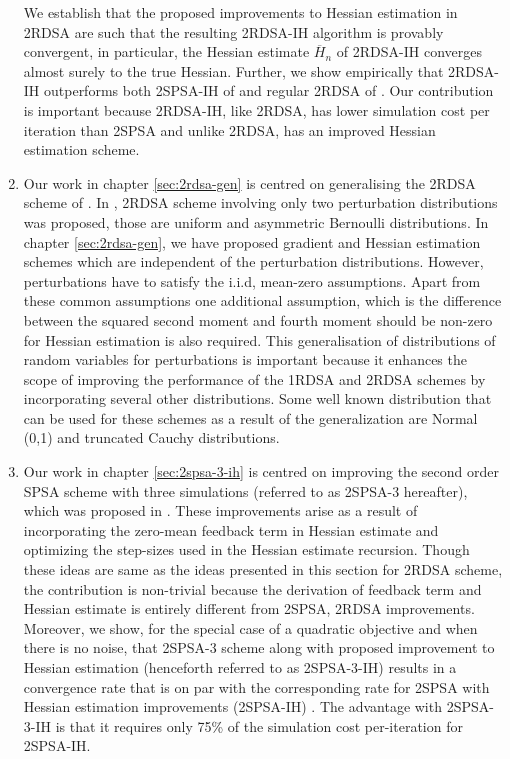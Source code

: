 \begin{enumerate}
We establish that the proposed improvements to Hessian estimation in 2RDSA are such  that the resulting 2RDSA-IH algorithm is provably convergent, in particular, the Hessian estimate $\overline H_n$ of 2RDSA-IH converges almost surely to the true Hessian. 
Further, we show empirically that 2RDSA-IH outperforms both 2SPSA-IH of \cite{spall-jacobian} and regular 2RDSA of \cite{prashanth2015rdsa}. Our contribution is important because 2RDSA-IH, like 2RDSA, has lower simulation cost per iteration than 2SPSA and unlike 2RDSA, has an improved Hessian estimation scheme.
\item Our work in chapter  \ref{sec:2rdsa-gen} is centred on generalising the 2RDSA scheme of \cite{prashanth2015rdsa}. In \cite{prashanth2015rdsa}, 2RDSA scheme involving only two perturbation distributions was proposed, those are uniform and asymmetric Bernoulli distributions. In chapter \ref{sec:2rdsa-gen}, we have proposed gradient and Hessian estimation schemes which are independent of the perturbation distributions. However, perturbations have to satisfy the i.i.d, mean-zero assumptions. Apart from these common assumptions  one additional assumption, which is the difference between the squared second moment  and fourth moment should be non-zero for Hessian estimation is also required. This generalisation of distributions of random variables for perturbations is important because it enhances the scope of improving the performance of the 1RDSA and 2RDSA schemes by incorporating several other distributions. Some well known distribution that can be used for these schemes as a result of the generalization are Normal (0,1) and truncated Cauchy distributions.
\item Our work in chapter \ref{sec:2spsa-3-ih} is centred on improving the second order SPSA scheme with three simulations (referred to as 2SPSA-3 hereafter), which was proposed in  \cite{bhatnagar2015simultaneous}. These improvements arise as a result of incorporating the zero-mean feedback term in Hessian estimate and optimizing the step-sizes used in the Hessian estimate recursion. Though these ideas are same as the ideas presented in this section for 2RDSA scheme, the contribution is non-trivial because the derivation of feedback term and Hessian estimate is entirely different from 2SPSA, 2RDSA improvements. Moreover, we show, for the special case of a quadratic objective and when there is no noise, that 2SPSA-3 scheme along with proposed improvement to Hessian estimation (henceforth referred to as 2SPSA-3-IH) results in a convergence rate that is on par with the corresponding rate for 2SPSA with Hessian estimation improvements (2SPSA-IH) \cite{spall-jacobian}. The advantage with 2SPSA-3-IH is that it requires only 75\% of the simulation cost per-iteration for 2SPSA-IH.
\end{enumerate}

